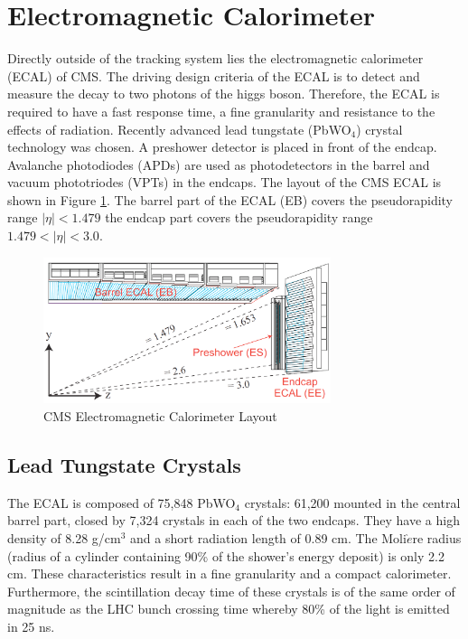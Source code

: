  \section{Electromagnetic Calorimeter}
Directly outside of the tracking system lies the electromagnetic calorimeter 
(ECAL) of CMS. The driving design criteria of the ECAL is 
to detect and measure the decay to two photons of the higgs boson. Therefore, the 
ECAL is required to have a %
fast response time, a fine granularity and resistance to the effects of radiation.
Recently advanced lead tungstate (PbWO$_{4}$) crystal technology was chosen. 
A preshower detector is placed in front of the endcap. Avalanche photodiodes (APDs)
are used as photodetectors in the barrel and vacuum phototriodes (VPTs) in the
endcaps.
The layout of the CMS ECAL is shown in Figure \ref{fig:ECALLayout}.
The barrel part of the ECAL (EB) covers the pseudorapidity range $|\eta|<1.479$
the endcap part covers the pseudorapidity range $1.479<|\eta|<3.0$.
\begin{figure}[hb]
  \centering
	\includegraphics[width=0.75\textwidth]{images/ECALPreshower.png}
  	\caption[ECAL Layout]
   	{CMS Electromagnetic Calorimeter Layout}
	\label{fig:ECALLayout}
\end{figure}
\subsection{Lead Tungstate Crystals}
The ECAL is composed of 75,848 PbWO$_{4}$ crystals: 61,200 mounted in the 
central barrel part, closed by 7,324 crystals in each of the two endcaps. They 
have a high density of 8.28 g/cm$^{3}$ and a short radiation length of 0.89 cm. 
The Moli$\grave{e}$re radius (radius of a cylinder containing 90\% of the shower's energy deposit) 
is only 2.2 cm. These characteristics result in a fine granularity and a compact
calorimeter. Furthermore, the scintillation decay time of these crystals is of the
same order of magnitude as the LHC bunch crossing time whereby 80\% of 
the light is emitted in 25 ns. 
